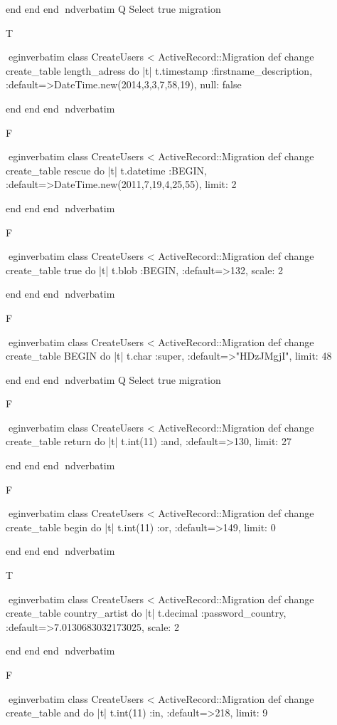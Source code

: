     end 
  end 
end
nd{verbatim}
Q
 Select true migration

T

egin{verbatim}
 class CreateUsers < ActiveRecord::Migration 
  def change 
    create_table length_adress do |t| 
      t.timestamp :firstname_description, :default=>DateTime.new(2014,3,3,7,58,19), null: false
    
    end 
  end 
end
nd{verbatim}

F

egin{verbatim}
 class CreateUsers < ActiveRecord::Migration 
  def change 
    create_table rescue do |t| 
      t.datetime :BEGIN, :default=>DateTime.new(2011,7,19,4,25,55), limit: 2
    
    end 
  end 
end
nd{verbatim}

F

egin{verbatim}
 class CreateUsers < ActiveRecord::Migration 
  def change 
    create_table true do |t| 
      t.blob :BEGIN, :default=>132, scale: 2
    
    end 
  end 
end
nd{verbatim}

F

egin{verbatim}
 class CreateUsers < ActiveRecord::Migration 
  def change 
    create_table BEGIN do |t| 
      t.char :super, :default=>"HDzJMgjI", limit: 48
    
    end 
  end 
end
nd{verbatim}
Q
 Select true migration

F

egin{verbatim}
 class CreateUsers < ActiveRecord::Migration 
  def change 
    create_table return do |t| 
      t.int(11) :and, :default=>130, limit: 27
    
    end 
  end 
end
nd{verbatim}

F

egin{verbatim}
 class CreateUsers < ActiveRecord::Migration 
  def change 
    create_table begin do |t| 
      t.int(11) :or, :default=>149, limit: 0
    
    end 
  end 
end
nd{verbatim}

T

egin{verbatim}
 class CreateUsers < ActiveRecord::Migration 
  def change 
    create_table country_artist do |t| 
      t.decimal :password_country, :default=>7.0130683032173025, scale: 2
    
    end 
  end 
end
nd{verbatim}

F

egin{verbatim}
 class CreateUsers < ActiveRecord::Migration 
  def change 
    create_table and do |t| 
      t.int(11) :in, :default=>218, limit: 9
    

